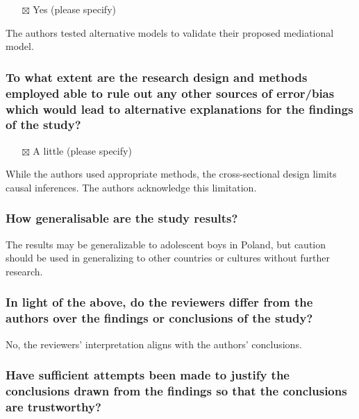 \documentclass[
  doc, a4paper]{apa7}
\providecommand{\tightlist}{%
  \setlength{\itemsep}{0pt}\setlength{\parskip}{0pt}}
\begin{document}
\begin{itemize}
\tightlist
\item[$\boxtimes$]
  Yes (please specify)
\end{itemize}

The authors tested alternative models to validate their proposed mediational model.

\subsubsection{To what extent are the research design and methods employed able to rule out any other sources of error/bias which would lead to alternative explanations for the findings of the study?}\label{to-what-extent-are-the-research-design-and-methods-employed-able-to-rule-out-any-other-sources-of-errorbias-which-would-lead-to-alternative-explanations-for-the-findings-of-the-study}

\begin{itemize}
\tightlist
\item[$\boxtimes$]
  A little (please specify)
\end{itemize}

While the authors used appropriate methods, the cross-sectional design limits causal inferences. The authors acknowledge this limitation.

\subsubsection{How generalisable are the study results?}\label{how-generalisable-are-the-study-results}

The results may be generalizable to adolescent boys in Poland, but caution should be used in generalizing to other countries or cultures without further research.

\subsubsection{In light of the above, do the reviewers differ from the authors over the findings or conclusions of the study?}\label{in-light-of-the-above-do-the-reviewers-differ-from-the-authors-over-the-findings-or-conclusions-of-the-study}

No, the reviewers' interpretation aligns with the authors' conclusions.

\subsubsection{Have sufficient attempts been made to justify the conclusions drawn from the findings so that the conclusions are trustworthy?}\label{have-sufficient-attempts-been-made-to-justify-the-conclusions-drawn-from-the-findings-so-that-the-conclusions-are-trustworthy}
\end{document}
